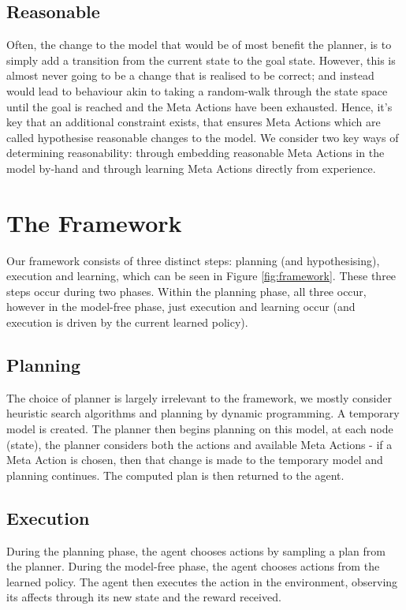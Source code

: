 \subsection{Reasonable}
Often, the change to the model that would be of most benefit the planner, is to simply add a transition from the current state to the goal state. However, this is almost never going to be a change that is realised to be correct; and instead would lead to behaviour akin to taking a random-walk through the state space until the goal is reached and the Meta Actions have been exhausted. Hence, it's key that an additional constraint exists, that ensures Meta Actions which are called hypothesise reasonable changes to the model. We consider two key ways of determining reasonability: through embedding reasonable Meta Actions in the model by-hand and through learning Meta Actions directly from experience.

\section{The Framework}
Our framework consists of three distinct steps: planning (and hypothesising), execution and learning, which can be seen in Figure \ref{fig:framework}. These three steps occur during two phases. Within the planning phase, all three occur, however in the model-free phase, just execution and learning occur (and execution is driven by the current learned policy).

\subsection{Planning}
The choice of planner is largely irrelevant to the framework, we mostly consider heuristic search algorithms and planning by dynamic programming.
A temporary model is created. The planner then begins planning on this model, at each node (state), the planner considers both the actions and available Meta Actions - if a Meta Action is chosen, then that change is made to the temporary model and planning continues. The computed plan is then returned to the agent.
\subsection{Execution}
During the planning phase, the agent chooses actions by sampling a plan from the planner. During the model-free phase, the agent chooses actions from the learned policy. The agent then executes the action in the environment, observing its affects through its new state and the reward received.
